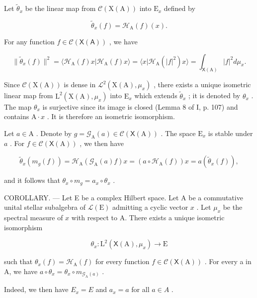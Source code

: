 Let \(\widetilde{\theta}_x\) be the linear map from \(\mathcal{C}(\mathrm{X(A)})\) into \(\mathrm{E}_x\) defined by

\[
\widetilde {\theta} _ {x} (f) = \mathcal {H} _ {\mathrm{A}} (f) (x).
\]

For any function \(f \in \mathcal{C}(\mathsf{X}(\mathsf{A}))\) , we have

\[
\| \widetilde {\theta} _ {x} (f) \| ^ {2} = \langle \mathcal {H} _ {\mathrm{A}} (f) x | \mathcal {H} _ {\mathrm{A}} (f) x \rangle = \langle x | \mathcal {H} _ {\mathrm{A}} (| f | ^ {2}) x \rangle = \int_ {\mathsf {X} (\mathrm{A})} | f | ^ {2} d \mu_ {x}.
\]

Since \(\mathcal{C}(\mathrm{X(A)})\) is dense in \(\mathcal{L}^2 (\mathrm{X(A)},\mu_x)\) , there exists a unique isometric linear map from \(\mathrm{L}^2 (\mathrm{X(A)},\mu_x)\) into \(\mathrm{E}_x\) which extends \(\widetilde{\theta}_x\) ; it is denoted by \(\theta_{x}\) . The map \(\theta_{x}\) is surjective since its image is closed (Lemma 8 of I, p. 107) and contains \(\mathrm{A}\cdot x\) . It is therefore an isometric isomorphism.

Let \(a \in \mathrm{A}\) . Denote by \(g = \mathcal{G}_{\mathrm{A}}(a) \in \mathcal{C}(\mathsf{X}(\mathrm{A}))\) . The space \(\mathrm{E}_x\) is stable under \(a\) . For \(f \in \mathcal{C}(\mathsf{X}(\mathrm{A}))\) , we then have

\[
\widetilde {\theta} _ {x} (m _ {g} (f)) = \mathcal {H} _ {\mathrm{A}} (\mathcal {G} _ {\mathrm{A}} (a) f) x = (a \circ \mathcal {H} _ {\mathrm{A}} (f)) x = a (\widetilde {\theta} _ {x} (f)),
\]

and it follows that \(\theta_x \circ m_g = a_x \circ \theta_x\) .

COROLLARY. — Let E be a complex Hilbert space. Let A be a commutative unital stellar subalgebra of \(\mathcal{L}(\mathrm{E})\) admitting a cyclic vector \(x\) . Let \(\mu_x\) be the spectral measure of \(x\) with respect to A. There exists a unique isometric isomorphism

\[
\theta_ {x} \colon \mathrm{L} ^ {2} (\mathsf {X} (\mathrm{A}), \mu_ {x}) \to \mathrm{E}
\]

such that \(\theta_x(f) = \mathcal{H}_{\mathrm{A}}(f)\) for every function \(f \in \mathcal{C}(\mathsf{X}(\mathrm{A}))\) . For every a in A, we have \(a \circ \theta_x = \theta_x \circ m_{\mathcal{G}_{\mathrm{A}}(a)}\) .

Indeed, we then have \(E_{x}=E\) and \(a_{x}=a\) for all \(a\in A\) .

